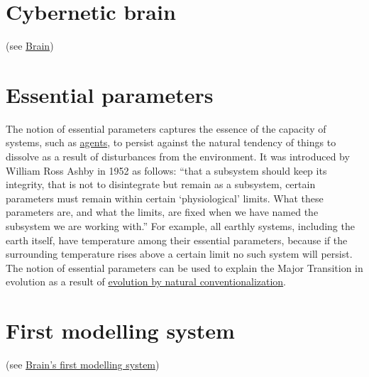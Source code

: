 \documentclass[12pt]{article}
\begin{document}
\hypertarget{cybernetic_brain}{}
\section{Cybernetic brain} (see \hyperlink{brain}{Brain})


\hypertarget{essential_parameters}{}
\section{Essential parameters}
The notion of essential parameters captures the essence of the
capacity of systems, such as \hyperlink{agent}{agents}, to persist
against the natural tendency of things to dissolve as a result of
disturbances from the environment. It was introduced by William Ross
Ashby in 1952 as follows: ``that a subsystem should keep its
integrity, that is not to disintegrate but remain as a subsystem,
certain parameters must remain within certain `physiological'
limits. What these parameters are, and what the limits, are fixed when
we have named the subsystem we are working with.''
\cite{Ashby_1952_design_brain} For example, all earthly systems,
including the earth itself, have temperature among their essential
parameters, because if the surrounding temperature rises above a
certain limit no such system will persist. The notion of essential
parameters can be used to explain the Major Transition in evolution as
a result of \hyperlink{natural_conventionalization}{evolution by
  natural conventionalization}.

\hypertarget{first_modelling_system}{}
\section{First modelling system} (see \hyperlink{brains_first_modelling_system}{Brain's first modelling system})

\hypertarget{fitness}{}
\end{document}
